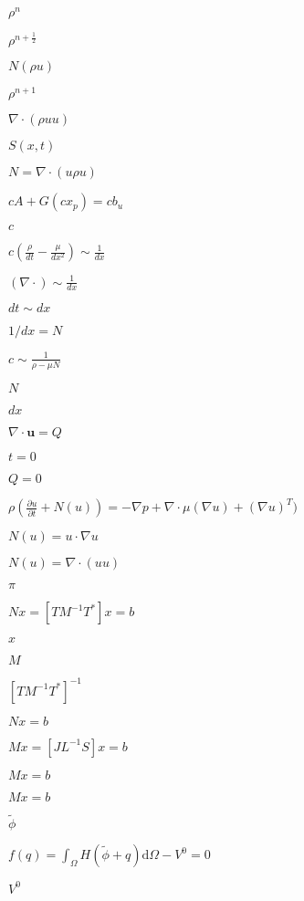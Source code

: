 \documentclass{article}
\begin{document}
$\rho^n$
\pagebreak

$\rho^{n+\frac{1}{2}}$
\pagebreak

$N(\rho u)$
\pagebreak

$\rho^{n+1}$
\pagebreak

$ \nabla \cdot (\rho u u)$
\pagebreak

$ S(x,t) $
\pagebreak

$N = \nabla \cdot (u \rho u)$
\pagebreak

$ c A + G(c x_p) = c b_u$
\pagebreak

$ c $
\pagebreak

$ c(\frac{\rho}{dt} - \frac{\mu}{dx^2}) \sim \frac{1}{dx} $
\pagebreak

$ (\nabla \cdot) \sim \frac{1}{dx} $
\pagebreak

$ dt \sim dx $
\pagebreak

$ 1/dx = N $
\pagebreak

$ c \sim \frac{1}{\rho - \mu N} $
\pagebreak

$ N $
\pagebreak

$ dx $
\pagebreak

$ \nabla \cdot \mathbf{u} = Q $
\pagebreak

$ t = 0 $
\pagebreak

$ Q = 0 $
\pagebreak

$\rho(\frac{\partial u}{\partial t} + N(u)) = -\nabla p + \nabla \cdot \mu (\nabla u) + (\nabla u)^T )$
\pagebreak

$ N(u) = u \cdot \nabla u $
\pagebreak

$ N(u) = \nabla \cdot (u u) $
\pagebreak

$ \pi $
\pagebreak

$ Nx = [T M^{-1} T^{*}]x = b $
\pagebreak

$ x $
\pagebreak

$ M $
\pagebreak

$ [T M^{-1} T^{*}]^{-1} $
\pagebreak

$ Nx = b $
\pagebreak

$ Mx = [J L^{-1} S]x = b $
\pagebreak

$ Mx=b $
\pagebreak

$ Mx = b $
\pagebreak

$ \tilde{\phi} $
\pagebreak

$ f(q) = \int_{\Omega} H(\tilde{\phi} + q) \text{d}\Omega - V^0
= 0 $
\pagebreak

$ V^0
$
\pagebreak
\end{document}
